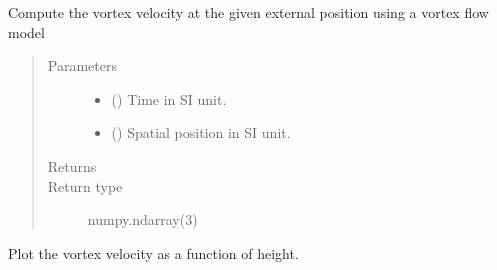 \documentclass[letterpaper,10pt,openany,oneside,english]{sphinxmanual}
\begin{document}
\begin{fulllineitems}
\begin{fulllineitems}
\begin{fulllineitems}
\end{fulllineitems}


\end{fulllineitems}


\begin{fulllineitems}
\label{\detokenize{examples_rst/vortex:vortex.Vortex.compute_velocity}}
Compute the vortex velocity at the given external
position using a vortex flow model
\begin{quote}\begin{description}
\item[{Parameters}] \leavevmode\begin{itemize}
\item {} 
 () \textendash{} Time in SI unit.

\item {} 
 (\sphinxstyleliteralemphasis{\sphinxupquote{(}}\sphinxstyleliteralemphasis{\sphinxupquote{)}}) \textendash{} Spatial position in SI unit.

\end{itemize}

\item[{Returns}] \leavevmode
{}

\item[{Return type}] \leavevmode
numpy.ndarray(3)

\end{description}\end{quote}

\end{fulllineitems}


\begin{fulllineitems}
\label{\detokenize{examples_rst/vortex:vortex.Vortex.plot_velocity}}
Plot the vortex velocity as a function of height.

\end{fulllineitems}


\end{fulllineitems}
\end{document}
